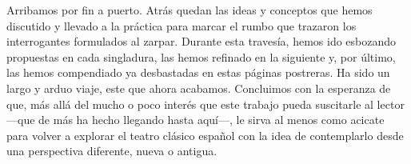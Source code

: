 Arribamos por fin a puerto. Atrás quedan las ideas y conceptos que hemos discutido y llevado a la práctica para marcar el rumbo que trazaron los interrogantes formulados al zarpar. Durante esta travesía, hemos ido esbozando propuestas en cada singladura, las hemos refinado en la siguiente y, por último, las hemos compendiado ya desbastadas en estas páginas postreras. Ha sido un largo y arduo viaje, este que ahora acabamos. Concluimos con la esperanza de que, más allá del mucho o poco interés que este trabajo pueda suscitarle al lector —que de más ha hecho llegando hasta aquí—, le sirva al menos como acicate para volver a explorar el teatro clásico español con la idea de contemplarlo desde una perspectiva diferente, nueva o antigua.
